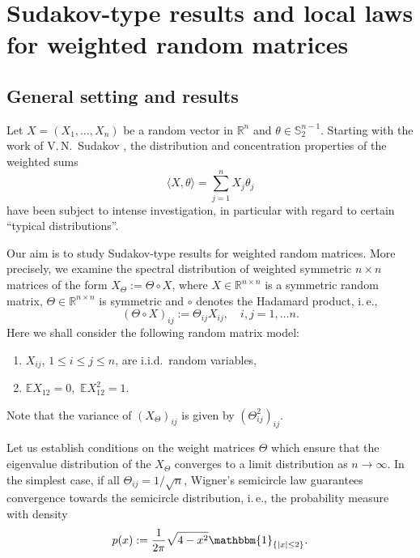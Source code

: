 \documentclass[a4paper,12pt]{amsart}
\numberwithin{equation}{section}
\theoremstyle{remark}
\def\E{{\mathbb E}}
\def\R{{\mathbb R}}
\def\S{{\mathbb S}}
\begin{document}
\section{Sudakov-type results and local laws for weighted random matrices}\label{sec:Sud}

\subsection{General setting and results}

Let $X = (X_1, \ldots,X_n)$ be a random vector in $\R^n$ and $\theta \in \S_2^{n-1}$. Starting with the work of V.\,N.\ Sudakov \cite{Sud78}, the distribution and concentration properties of the weighted sums
\[
\langle X, \theta \rangle = \sum_{j=1}^n X_j \theta_j
\]
have been subject to intense investigation, in particular with regard to certain ``typical distributions''.

Our aim is to study Sudakov-type results for weighted random matrices. More precisely, we examine the spectral distribution of weighted symmetric $n\times n$ matrices of the form $X_\Theta:= \Theta \circ X$, where $X \in \R^{n \times n}$ is a symmetric random matrix, $\Theta \in \R^{n \times n}$ is symmetric and $\circ$ denotes the Hadamard product, i.\,e.,
\[ (\Theta \circ X )_{ij} := \Theta_{ij} X_{ij}, \quad  i,j=1, \ldots n. \]
Here we shall consider the following random matrix model:
\begin{enumerate}
\item $X_{ij}$, $1 \le i \le j \le n$, are i.i.d.\ random variables,
\item $\E X_{12} = 0,$ $\E X_{12}^2 =1$.
\end{enumerate}
Note that the variance of $(X_\Theta)_{ij} $ is given by $(\Theta_{ij}^2)_{ij}$.

Let us establish conditions on the weight matrices $\Theta$ which ensure that the eigenvalue distribution of the $X_\Theta$ converges to a limit distribution as $n \to \infty$. In the simplest case, if all $\Theta_{ij} = 1/\sqrt{n}$, Wigner's semicircle law guarantees convergence towards the semicircle distribution, i.\,e., the probability measure with density
\[
p(x):=\frac 1 {2 \pi} \sqrt{4 -x^2} \mathbbm{1}_{\{|x| \le 2\}}.
\]
\end{document}
